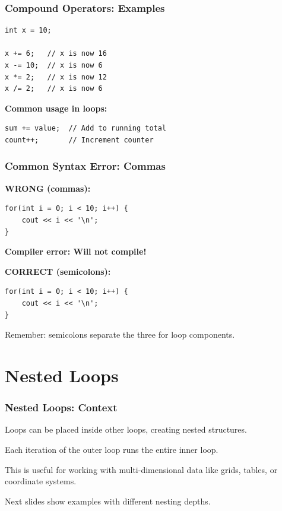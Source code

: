 \documentclass{beamer}
\begin{document}
\begin{frame}[fragile]
\frametitle{Compound Operators: Examples}
\begin{verbatim}
int x = 10;

x += 6;   // x is now 16
x -= 10;  // x is now 6
x *= 2;   // x is now 12
x /= 2;   // x is now 6
\end{verbatim}
\pause

\textbf{Common usage in loops:}
\begin{verbatim}
sum += value;  // Add to running total
count++;       // Increment counter
\end{verbatim}
\end{frame}

\begin{frame}[fragile]
\frametitle{Common Syntax Error: Commas}
\textbf{WRONG (commas):}
\begin{verbatim}
for(int i = 0; i < 10; i++) {
    cout << i << '\n';
}
\end{verbatim}
\pause

\textbf{Compiler error: Will not compile!}\pause

\textbf{CORRECT (semicolons):}
\begin{verbatim}
for(int i = 0; i < 10; i++) {
    cout << i << '\n';
}
\end{verbatim}

Remember: semicolons separate the three for loop components.
\end{frame}

\section{Nested Loops}

\begin{frame}
\frametitle{Nested Loops: Context}
Loops can be placed inside other loops, creating nested structures.\pause

Each iteration of the outer loop runs the entire inner loop.\pause

This is useful for working with multi-dimensional data like grids, tables, or coordinate systems.\pause

Next slides show examples with different nesting depths.
\end{frame}
\end{document}
